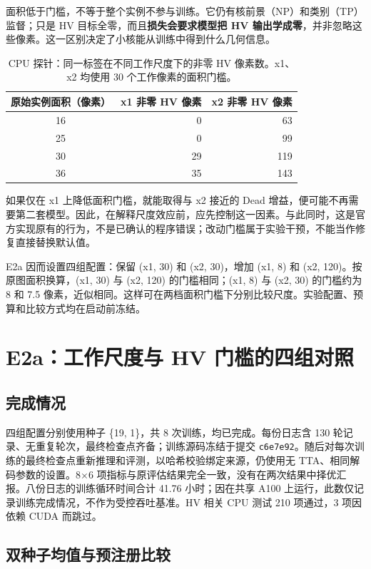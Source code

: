 \documentclass[11pt,a4paper,UTF8,fontset=fandol]{ctexart}
\newcommand{\code}[1]{\nolinkurl{#1}}
\begin{document}
面积低于门槛，不等于整个实例不参与训练。它仍有核前景（NP）和类别（TP）监督；只是 HV 目标全零，而且\textbf{损失会要求模型把 HV 输出学成零}，并非忽略这些像素。这一区别决定了小核能从训练中得到什么几何信息。

\begin{table}[H]
\centering\small
\caption{CPU 探针：同一标签在不同工作尺度下的非零 HV 像素数。x1、x2 均使用 30 个工作像素的面积门槛。}
\label{tab:hvprobe}
\begin{tabular}{crr}\toprule
原始实例面积（像素） & x1 非零 HV 像素 & x2 非零 HV 像素\\\midrule
16 & 0 & 63\\
25 & 0 & 99\\
30 & 29 & 119\\
36 & 35 & 143\\\bottomrule
\end{tabular}
\end{table}

如果仅在 x1 上降低面积门槛，就能取得与 x2 接近的 Dead 增益，便可能不再需要第二套模型。因此，在解释尺度效应前，应先控制这一因素。与此同时，这是官方实现原有的行为，不是已确认的程序错误；改动门槛属于实验干预，不能当作修复直接替换默认值。

E2a 因而设置四组配置：保留 (x1, 30) 和 (x2, 30)，增加 (x1, 8) 和 (x2, 120)。按原图面积换算，(x1, 30) 与 (x2, 120) 的门槛相同；(x1, 8) 与 (x2, 30) 的门槛约为 8 和 7.5 像素，近似相同。这样可在两档面积门槛下分别比较尺度。实验配置、预算和比较方式均在启动前冻结\cite{hvplan}。

\section{E2a：工作尺度与 HV 门槛的四组对照}

\subsection{完成情况}

四组配置分别使用种子 \{19, 1\}，共 8 次训练，均已完成。每份日志含 130 轮记录、无重复轮次，最终检查点齐备；训练源码冻结于提交 \code{c6e7e92}。随后对每次训练的最终检查点重新推理和评测，以哈希校验绑定来源，仍使用无 TTA、相同解码参数的设置。8$\times$6 项指标与原评估结果完全一致，没有在两次结果中择优汇报。八份日志的训练循环时间合计 41.76 小时；因在共享 A100 上运行，此数仅记录训练完成情况，不作为受控吞吐基准。HV 相关 CPU 测试 210 项通过，3 项因依赖 CUDA 而跳过。

\subsection{双种子均值与预注册比较}
\end{document}
